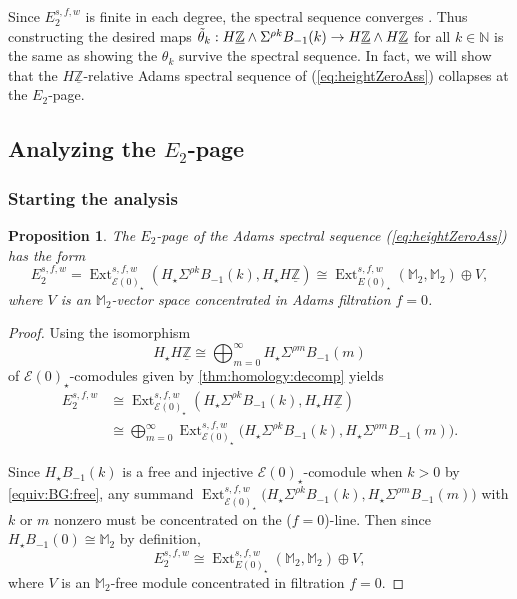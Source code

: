 \documentclass{amsart}
\newtheorem{proposition}[equation]{Proposition}
\theoremstyle{plain}
\numberwithin{equation}{section}
\numberwithin{figure}{section}
\DeclareMathOperator{\Ext}{Ext}
\newcommand{\mM}{{\mathbb M}}
\newcommand{\mN}{{\mathbb N}}
\newcommand{\mZ}{{\mathbb Z}}
\newcommand{\cE}{{\mathcal E}}
\newcommand{\umZ}{\underline{\mZ}}
\newcommand{\0}{\langle 0 \rangle }
\begin{document}
Since $E_{2}^{s,f,w}$ is finite in each degree, the spectral sequence converges \cite[Thm~15.6, Thm~7.1]{boardman1999conditionally}. Thus constructing the desired maps $\Tilde{\theta}_k : H \umZ \wedge \Sigma^{\rho k} B_{-1} (k) \to H \umZ \wedge H \umZ$ for all $k \in \mN$ is the same as showing the $\theta_k$ survive the spectral sequence. In fact, we will show that the $H \umZ$-relative Adams spectral sequence of (\ref{eq:heightZeroAss}) collapses at the $E_{2}$-page.

\subsection{Analyzing the $E_{2}$-page}
\subsubsection{Starting the analysis}

\begin{proposition}\label{E2:zero:split}
The $E_2$-page of the Adams spectral sequence (\ref{eq:heightZeroAss}) has the form
\[ E_2^{s, f, w} = \Ext_{\cE(0)_{\star}}^{s,f, w} (H_{\star} \Sigma^{\rho k} B_{-1}(k), H_{\star} H \umZ ) \cong \Ext_{E(0)_{\star}}^{s,f,w} (\mM_2, \mM_2) \oplus V, \]
where $V$ is an $\mM_{2}$-vector space concentrated in Adams filtration $f=0$. 
\end{proposition}
\begin{proof}
Using the isomorphism 
\[
H_\star H \umZ \cong \bigoplus_{m = 0}^\infty H_\star \Sigma^{\rho m}  B_{- 1}(m) 
\]
of $\cE(0)_\star$-comodules given by \cref{thm:homology:decomp} yields
\begin{align*}
E_2^{s, f, w} & \cong \Ext_{\cE(0)_{\star}}^{s, f, w} (H_{\star} \Sigma^{\rho k} B_{-1}(k), H_{\star} H \umZ )  \\
&  \cong \bigoplus\limits_{m=0}^{\infty} \Ext_{\cE(0)_{\star}}^{s,f,w} \big( H_{\star} \Sigma^{\rho k} B_{-1}(k), H_{\star} \Sigma^{\rho m} B_{-1}(m) \big).
\end{align*}

Since $H_{\star}B_{-1}(k)$ is a free and injective $\cE(0)_{\star}$-comodule when $k > 0$ by \cref{equiv:BG:free}, any summand $\Ext_{\cE(0)_{\star}}^{s,f,w} \big(H_{\star} \Sigma^{\rho k} B_{-1}(k), H_{\star} \Sigma^{\rho m} B_{-1}(m) \big)$ with $k$ or $m$ nonzero must be concentrated on the ($f=0$)-line. Then since $H_{\star}B_{-1}(0) \cong \mM_{2}$ by definition,
\[ E_2^{s, f,w} \cong \Ext_{E(0)_{\star}}^{s,f,w} (\mM_2, \mM_2) \oplus V, \]
where $V$ is an $\mM_{2}$-free module concentrated in filtration $f=0$. 
\end{proof}
\end{document}
